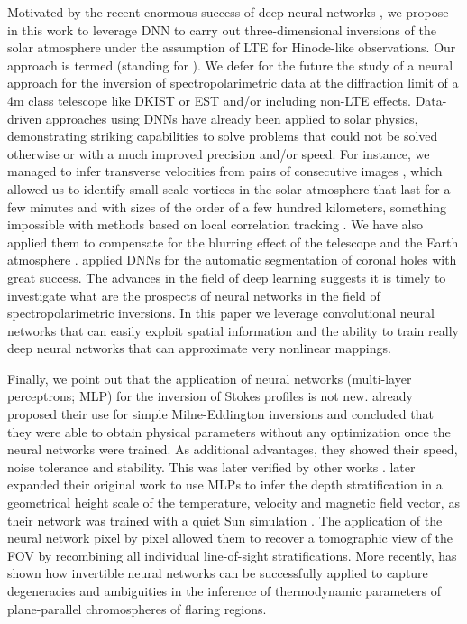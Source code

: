 Motivated by the recent enormous success of deep neural networks 
\citep{Goodfellow2016}, we 
propose in this work to leverage DNN to carry out three-dimensional inversions 
of the solar atmosphere under the assumption of LTE for Hinode-like
observations. Our approach is termed  (standing for ).
We defer for the future the study of a neural approach
for the inversion of spectropolarimetric data at the diffraction limit of
a 4m class telescope like DKIST or EST and/or including non-LTE effects.
Data-driven approaches using DNNs have already been applied to solar
physics, demonstrating striking capabilities to solve problems that could not
be solved otherwise or with a much improved precision and/or speed. For instance, we 
managed to infer transverse velocities from pairs of consecutive 
images \cite[DeelVel;][]{Asensio2017}, which allowed us to identify 
small-scale vortices in the solar atmosphere that last for a few minutes and with
sizes of the order of a few hundred kilometers, something
impossible with methods based on local correlation tracking \cite{NovemberSimon_1988}. 
We have also applied them to
compensate for the blurring effect of the telescope and the Earth atmosphere
\cite{Enhance18,DeepMFBD18}. \cite{Illarionov18} applied DNNs for the automatic
segmentation of coronal holes with great success.
The advances in the field of deep learning suggests it is 
timely to investigate what are the prospects of neural networks in the field
of spectropolarimetric inversions. In this paper
we leverage convolutional neural 
networks \cite[CNN;][]{LeCun1998} that can easily exploit spatial information and 
the ability to train really deep neural networks that can approximate very nonlinear mappings.

Finally, we point out that the application of neural networks (multi-layer perceptrons; MLP) 
for the inversion of Stokes profiles is not
new. \cite{Carroll2001} already proposed their use for simple Milne-Eddington
inversions and concluded that they were able to obtain physical parameters
without any optimization once the neural networks were trained. As additional
advantages, they showed their speed, noise tolerance and stability. This
was later verified by other works \cite{socas_nn_03,socas_nn_05}. 
\cite{Carroll2008} later expanded their original work to use MLPs to
infer the depth stratification in a geometrical height scale of the temperature, velocity and
magnetic field vector, as their network was trained with a quiet Sun simulation \cite{vogler05}.
The application of the neural network pixel by pixel allowed them to recover
a tomographic view of the FOV by recombining all individual line-of-sight stratifications. 
More recently, \cite{osborne2019} has shown
how invertible neural networks \cite[INNs;][]{Ardizzone2018} can be successfully applied to capture 
degeneracies and ambiguities in the inference of thermodynamic parameters of
plane-parallel chromospheres of flaring regions.

